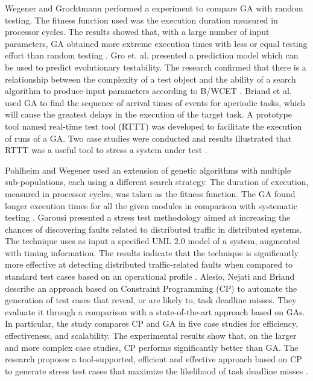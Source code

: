 \documentclass[espaco=umemeio,chapter=TITLE,twoside,openright]{abnt}
\begin{document}
Wegener and Grochtmann performed a  experiment to compare GA with random testing. The fitness function used was the execution duration measured in processor cycles.  The results showed that, with a large number of input parameters, GA obtained more extreme execution times with less or equal testing effort than random testing \cite{J.WegenerK.GrimmM.GrochtmannH.Sthamer1996} \cite{Wegener1998}. Gro et. al. \cite{Gross2000} presented a prediction model which can be used to predict evolutionary testability. The research confirmed that there is a relationship between the complexity of a test object and the ability of a search algorithm to produce input parameters according to B/WCET \cite{Gross2000}. Briand et al. \cite{Briand2005} used GA to find the sequence of arrival times of events for aperiodic tasks, which will cause the greatest delays in the execution of the target task. A prototype tool named real-time test tool (RTTT) was developed to facilitate the execution of runs of a GA. Two case studies were conducted and results illustrated that RTTT was a useful tool to stress a system under test \cite{Briand2005}.


Pohlheim and Wegener used an extension of genetic algorithms with multiple sub-populations, each using a different search strategy. The duration of execution, measured in processor cycles, was taken as the fitness
function. The GA found longer execution times for all the given modules in comparison with systematic testing \cite{Pohlheim2005}. Garousi presented a stress test methodology aimed at increasing the chances of discovering faults related to distributed traffic in distributed systems. The technique uses as input a specified UML 2.0 model of a system, augmented with timing information. The results indicate that the technique is significantly more effective at detecting distributed traffic-related faults when compared to standard test cases based on an operational profile \cite{Garousi2006}. Alesio, Nejati and Briand describe an approach based
on Constraint Programming (CP) to automate the generation of test cases that reveal, or are likely to, task deadline misses. They evaluate it through a comparison with a state-of-the-art approach based on GAs. In particular, the study compares CP and GA in five case studies for efficiency, effectiveness, and scalability. The experimental results show that, on the larger and more complex case studies, CP performs significantly better than GA. The research proposes a tool-supported, efficient and effective approach based on CP to generate stress test cases that maximize the likelihood of task deadline misses \cite{DiAlesio2013}.
\end{document}
